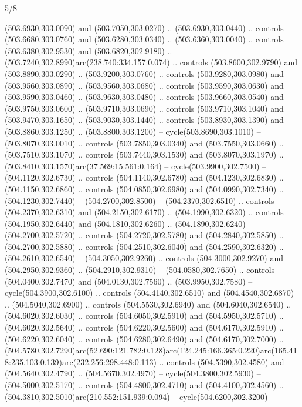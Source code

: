 \begin{flagdescription}{5/8}
\begin{scope}[xshift=0.5\flaglength,yshift=0.5\flagwidth,scale=\flagwidth/475.63]
\begin{scope}[y=0.8pt, x=0.8pt, yscale=-1, xscale=1,shift={(-450,-300)}]
\begin{scope}[cm={{1.0,0.0,0.0,1.0,(-0.0002,0.12556)}},cm={{1.0,0.0,0.0,1.0,(0.00179,0.0)}}]
\begin{scope}[cm={{1.11592,0.0,0.0,1.11592,(-106.89933,-41.77764)}}]
\begin{scope}[draw=black,fill=cfff]
\begin{scope}[fill=black]
  (503.6930,303.0090) and (503.7050,303.0270) .. (503.6930,303.0440) .. controls
  (503.6680,303.0760) and (503.6280,303.0340) .. (503.6360,303.0040) .. controls
  (503.6380,302.9530) and (503.6820,302.9180) ..
  (503.7240,302.8990)arc(238.740:334.157:0.074) .. controls (503.8600,302.9790)
  and (503.8890,303.0290) .. (503.9200,303.0760) .. controls (503.9280,303.0980)
  and (503.9560,303.0890) .. (503.9560,303.0680) .. controls (503.9590,303.0630)
  and (503.9590,303.0460) .. (503.9630,303.0480) .. controls (503.9660,303.0540)
  and (503.9750,303.0600) .. (503.9710,303.0690) .. controls (503.9710,303.1040)
  and (503.9470,303.1650) .. (503.9030,303.1440) .. controls (503.8930,303.1390)
  and (503.8860,303.1250) .. (503.8800,303.1200) -- cycle(503.8690,303.1010) --
  (503.8070,303.0010) .. controls (503.7850,303.0340) and (503.7550,303.0660) ..
  (503.7510,303.1070) .. controls (503.7440,303.1530) and (503.8070,303.1970) ..
  (503.8410,303.1570)arc(37.569:15.561:0.164) -- cycle(503.9900,302.7500) --
  (504.1120,302.6730) .. controls (504.1140,302.6780) and (504.1230,302.6830) ..
  (504.1150,302.6860) .. controls (504.0850,302.6980) and (504.0990,302.7340) ..
  (504.1230,302.7440) -- (504.2700,302.8500) -- (504.2370,302.6510) .. controls
  (504.2370,302.6310) and (504.2150,302.6170) .. (504.1990,302.6320) .. controls
  (504.1950,302.6440) and (504.1810,302.6260) .. (504.1890,302.6240) --
  (504.2700,302.5720) .. controls (504.2720,302.5780) and (504.2840,302.5850) ..
  (504.2700,302.5880) .. controls (504.2510,302.6040) and (504.2590,302.6320) ..
  (504.2610,302.6540) -- (504.3050,302.9260) .. controls (504.3000,302.9270) and
  (504.2950,302.9360) .. (504.2910,302.9310) -- (504.0580,302.7650) .. controls
  (504.0400,302.7470) and (504.0130,302.7560) .. (503.9950,302.7580) --
  cycle(504.3900,302.6100) .. controls (504.4140,302.6510) and
  (504.4540,302.6870) .. (504.5040,302.6900) .. controls (504.5530,302.6940) and
  (504.6040,302.6540) .. (504.6020,302.6030) .. controls (504.6050,302.5910) and
  (504.5950,302.5710) .. (504.6020,302.5640) .. controls (504.6220,302.5600) and
  (504.6170,302.5910) .. (504.6220,302.6040) .. controls (504.6280,302.6490) and
  (504.6170,302.7000) ..
  (504.5780,302.7290)arc(52.690:121.782:0.128)arc(124.245:166.365:0.220)arc(165.418:235.103:0.139)arc(232.256:298.448:0.113)
  .. controls (504.5390,302.4580) and (504.5640,302.4790) .. (504.5670,302.4970)
  -- cycle(504.3800,302.5930) -- (504.5000,302.5170) .. controls
  (504.4800,302.4710) and (504.4100,302.4560) ..
  (504.3810,302.5010)arc(210.552:151.939:0.094) -- cycle(504.6200,302.3200) --

\end{scope}
\end{scope}
\end{scope}
\end{scope}
\end{scope}
\end{scope}
\end{flagdescription}
